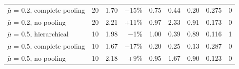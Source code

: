 \documentclass[10pt,a4paper]{article}
\begin{document}
\begin{minipage}{\linewidth}
\begin{tabular}{lrrrrrrrr}
$\bar{\mu}$ = 0.2, complete pooling & 20 & 1.70 & −15\% & 0.75 & 0.44 & 0.20 & 0.275 & 0 \\
$\bar{\mu}$ = 0.2, no pooling & 20 & 2.21 & +11\% & 0.97 & 2.33 & 0.91 & 0.173 & 0 \\
$\bar{\mu}$ = 0.5, hierarchical & 10 & 1.98 & −1\% & 1.00 & 0.39 & 0.89 & 0.116 & 1 \\
$\bar{\mu}$ = 0.5, complete pooling & 10 & 1.67 & −17\% & 0.20 & 0.25 & 0.13 & 0.287 & 0 \\
$\bar{\mu}$ = 0.5, no pooling & 10 & 2.18 & +9\% & 0.95 & 1.67 & 0.90 & 0.123 & 0 \\
\bottomrule
\end{tabular}
\end{minipage}
\vspace{22pt}


\clearpage
\end{document}
